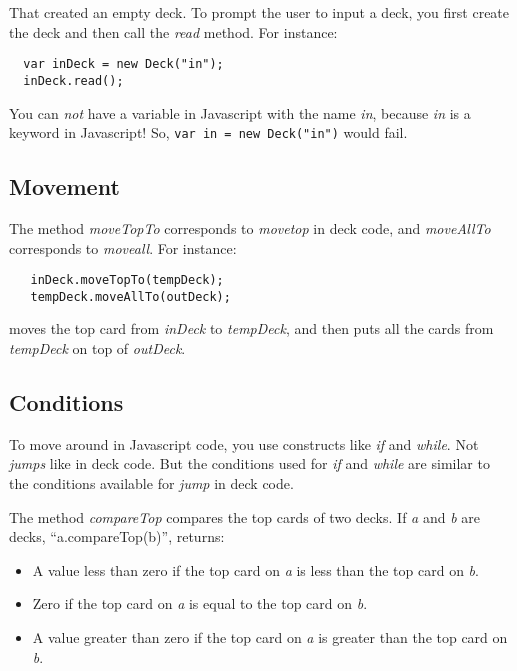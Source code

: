 \documentclass[a4paper,twoside]{tufte-handout}
\begin{document}
That created an empty deck. To prompt the user to input a deck, you
first create the deck and then call the \emph{read} method. For instance:
\begin{lstlisting}
  var inDeck = new Deck("in");
  inDeck.read();
\end{lstlisting}
You can \emph{not} have a variable in Javascript with the name
\emph{in}, because \emph{in} is a keyword in Javascript! So,
\verb'var in = new Deck("in")' would fail.

\subsection{Movement}\label{sec-move}

The method \emph{moveTopTo} corresponds to \emph{movetop} in deck
code, and \emph{moveAllTo} corresponds to \emph{moveall}. For instance:
\begin{lstlisting}
   inDeck.moveTopTo(tempDeck);
   tempDeck.moveAllTo(outDeck);
\end{lstlisting}
moves the top card from \emph{inDeck} to \emph{tempDeck}, and then puts all
the cards from \emph{tempDeck} on top of \emph{outDeck}.

\subsection{Conditions}\label{sec-conds}

To move around in Javascript code, you use constructs like \emph{if} and
\emph{while}. Not \emph{jumps} like in deck code. But the conditions
used for \emph{if} and \emph{while} are similar to the conditions
available for \emph{jump} in deck code.

The method \emph{compareTop} compares the top cards of two decks. If \emph{a} and \emph{b}
are decks, ``a.compareTop(b)'', returns:
\begin{itemize}
\item A value less than zero if the top card on \emph{a} is less than
  the top card on \emph{b}.
\item Zero if the top card on \emph{a} is equal to
  the top card on \emph{b}.
\item A value greater than zero if the top card on \emph{a} is greater than
  the top card on \emph{b}.
\end{itemize}
\end{document}

